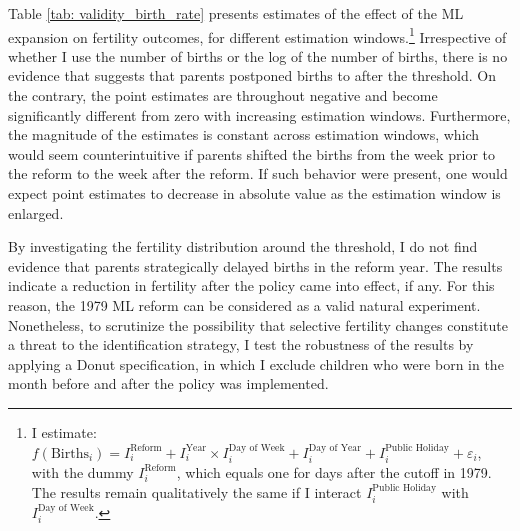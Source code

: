 \documentclass[11pt, a4paper, draft]{article} %
\begin{document}
Table \ref{tab: validity_birth_rate} presents estimates of the effect of the ML expansion on fertility outcomes, for different estimation windows.\footnote{I estimate: $f(\text{Births}_i) = I^{\text{Reform}}_i + I^{\text{Year}}_i\times I^{\text{Day of Week}}_i + I^{\text{Day of Year}}_i + I^{\text{Public Holiday}}_i + \varepsilon_i$, with the dummy $I^{\text{Reform}}_i$, which equals one for days after the cutoff in 1979. The results remain qualitatively the same if I interact $I^{\text{Public Holiday}}_i$ with $I^{\text{Day of Week}}_i$.} Irrespective of whether I use the number of births or the log of the number of births, there is no evidence that suggests that parents postponed births to after the threshold. On the contrary, the point estimates are throughout negative and become significantly different from zero with increasing estimation windows. Furthermore, the magnitude of the estimates is constant across estimation windows, which would seem counterintuitive if parents shifted the births from the week prior to the reform to the week after the reform. If such behavior were present, one would expect point estimates to decrease in absolute value as the estimation window is enlarged. 

By investigating the fertility distribution around the threshold, I do not find evidence that parents strategically delayed births in the reform year. The results indicate a reduction in fertility after the policy came into effect, if any. For this reason, the 1979 ML reform can be considered as a valid natural experiment. Nonetheless, to scrutinize the possibility that selective fertility changes constitute a threat to the identification strategy, I test the robustness of the results by applying a Donut specification, in which I exclude children who were born in the month before and after the policy was implemented.

 


	
\end{document}
